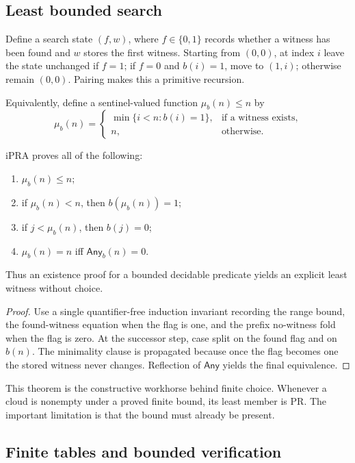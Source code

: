\subsection{Least bounded search}

Define a search state \((f,w)\), where \(f\in\{0,1\}\) records whether a
witness has been found and \(w\) stores the first witness.  Starting from
\((0,0)\), at index \(i\) leave the state unchanged if \(f=1\); if \(f=0\)
and \(b(i)=1\), move to \((1,i)\); otherwise remain \((0,0)\).  Pairing makes
this a primitive recursion.

Equivalently, define a sentinel-valued function \(\mu_b(n)\leq n\) by
\[
 \mu_b(n)=
 \begin{cases}
   \min\{i<n:b(i)=1\},&\text{if a witness exists},\\
   n,&\text{otherwise}.
 \end{cases}
\]

\begin{theorem}
\label{thm:least-search}
iPRA proves all of the following:
\begin{enumerate}
\item \(\mu_b(n)\leq n\);
\item if \(\mu_b(n)<n\), then \(b(\mu_b(n))=1\);
\item if \(j<\mu_b(n)\), then \(b(j)=0\);
\item \(\mu_b(n)=n\) iff \(\mathsf{Any}_b(n)=0\).
\end{enumerate}
Thus an existence proof for a bounded decidable predicate yields an explicit
least witness without choice.
\end{theorem}

\begin{proof}
Use a single quantifier-free induction invariant recording the range bound,
the found-witness equation when the flag is one, and the prefix no-witness
fold when the flag is zero.  At the successor step, case split on the found
flag and on \(b(n)\).  The minimality clause is propagated because once the
flag becomes one the stored witness never changes.  Reflection of
\(\mathsf{Any}\) yields the final equivalence.
\end{proof}

This theorem is the constructive workhorse behind finite choice.  Whenever a
cloud is nonempty under a proved finite bound, its least member is PR.  The
important limitation is that the bound must already be present.

\subsection{Finite tables and bounded verification}

